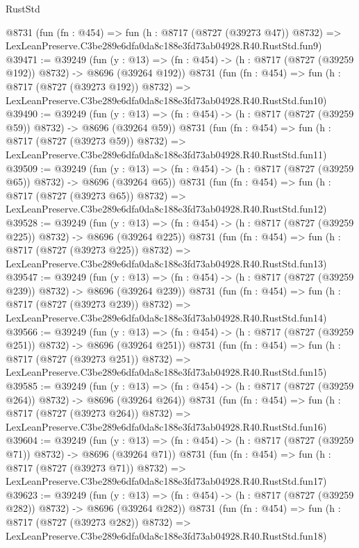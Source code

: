 \begin{lexlean}{RustStd}
\begin{coremodule}
    @8731
    (fun (fn : @454) =>
    fun (h : @8717 (@8727 (@39273 @47)) @8732) =>
    LexLeanPreserve.C3be289e6dfa0da8c188e3fd73ab04928.R40.RustStd.fun9)
@39471 := @39249
    (fun (y : @13) => (fn : @454) -> (h : @8717 (@8727 (@39259 @192)) @8732) -> @8696 (@39264 @192))
    @8731
    (fun (fn : @454) =>
    fun (h : @8717 (@8727 (@39273 @192)) @8732) =>
    LexLeanPreserve.C3be289e6dfa0da8c188e3fd73ab04928.R40.RustStd.fun10)
@39490 := @39249
    (fun (y : @13) => (fn : @454) -> (h : @8717 (@8727 (@39259 @59)) @8732) -> @8696 (@39264 @59))
    @8731
    (fun (fn : @454) =>
    fun (h : @8717 (@8727 (@39273 @59)) @8732) =>
    LexLeanPreserve.C3be289e6dfa0da8c188e3fd73ab04928.R40.RustStd.fun11)
@39509 := @39249
    (fun (y : @13) => (fn : @454) -> (h : @8717 (@8727 (@39259 @65)) @8732) -> @8696 (@39264 @65))
    @8731
    (fun (fn : @454) =>
    fun (h : @8717 (@8727 (@39273 @65)) @8732) =>
    LexLeanPreserve.C3be289e6dfa0da8c188e3fd73ab04928.R40.RustStd.fun12)
@39528 := @39249
    (fun (y : @13) => (fn : @454) -> (h : @8717 (@8727 (@39259 @225)) @8732) -> @8696 (@39264 @225))
    @8731
    (fun (fn : @454) =>
    fun (h : @8717 (@8727 (@39273 @225)) @8732) =>
    LexLeanPreserve.C3be289e6dfa0da8c188e3fd73ab04928.R40.RustStd.fun13)
@39547 := @39249
    (fun (y : @13) => (fn : @454) -> (h : @8717 (@8727 (@39259 @239)) @8732) -> @8696 (@39264 @239))
    @8731
    (fun (fn : @454) =>
    fun (h : @8717 (@8727 (@39273 @239)) @8732) =>
    LexLeanPreserve.C3be289e6dfa0da8c188e3fd73ab04928.R40.RustStd.fun14)
@39566 := @39249
    (fun (y : @13) => (fn : @454) -> (h : @8717 (@8727 (@39259 @251)) @8732) -> @8696 (@39264 @251))
    @8731
    (fun (fn : @454) =>
    fun (h : @8717 (@8727 (@39273 @251)) @8732) =>
    LexLeanPreserve.C3be289e6dfa0da8c188e3fd73ab04928.R40.RustStd.fun15)
@39585 := @39249
    (fun (y : @13) => (fn : @454) -> (h : @8717 (@8727 (@39259 @264)) @8732) -> @8696 (@39264 @264))
    @8731
    (fun (fn : @454) =>
    fun (h : @8717 (@8727 (@39273 @264)) @8732) =>
    LexLeanPreserve.C3be289e6dfa0da8c188e3fd73ab04928.R40.RustStd.fun16)
@39604 := @39249
    (fun (y : @13) => (fn : @454) -> (h : @8717 (@8727 (@39259 @71)) @8732) -> @8696 (@39264 @71))
    @8731
    (fun (fn : @454) =>
    fun (h : @8717 (@8727 (@39273 @71)) @8732) =>
    LexLeanPreserve.C3be289e6dfa0da8c188e3fd73ab04928.R40.RustStd.fun17)
@39623 := @39249
    (fun (y : @13) => (fn : @454) -> (h : @8717 (@8727 (@39259 @282)) @8732) -> @8696 (@39264 @282))
    @8731
    (fun (fn : @454) =>
    fun (h : @8717 (@8727 (@39273 @282)) @8732) =>
    LexLeanPreserve.C3be289e6dfa0da8c188e3fd73ab04928.R40.RustStd.fun18)

\end{coremodule}
\end{lexlean}
